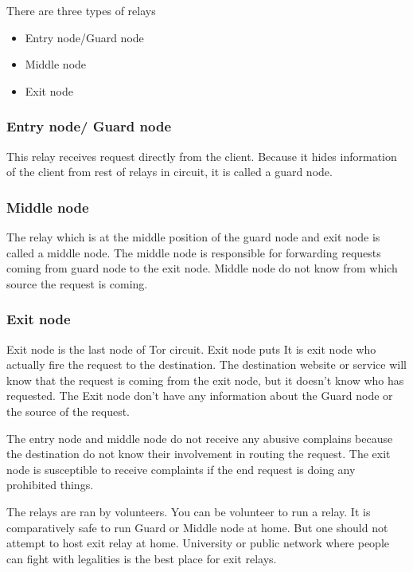 \documentclass{article}
\begin{document}
      There are three types of relays

      \begin{itemize}
        \item{Entry node/Guard node}
        \item{Middle node}
        \item{Exit node}
      \end{itemize}

      \subsubsection{Entry node/ Guard node}
        This relay receives request directly from the client. Because it hides
        information of the client from rest of relays in circuit, it is called
        a guard node.

      \subsubsection{Middle node}
        The relay which is at the middle position of the guard node and exit
        node is called a middle node. The middle node is responsible for
        forwarding requests coming from guard node to the exit node. Middle
        node do not know from which source the request is coming.

      \subsubsection{Exit node}
        Exit node is the last node of Tor circuit. Exit node puts It is exit
        node who actually fire the request to the destination. The destination
        website or service will know that the request is coming from the exit
        node, but it doesn't know who has requested. The Exit node don't have
        any information about the Guard node or the source of the request.


      The entry node and middle node do not receive any abusive complains
      because the destination do not know their involvement in routing the
      request. The exit node is susceptible to receive complaints if the end
      request is doing any prohibited things.

      The relays are ran by volunteers. You can be volunteer to run a relay.
      It is comparatively safe to run Guard or Middle node at home. But one
      should not attempt to host exit relay at home. University or public
      network where people can fight with legalities is the best place for exit
      relays.
\end{document}
